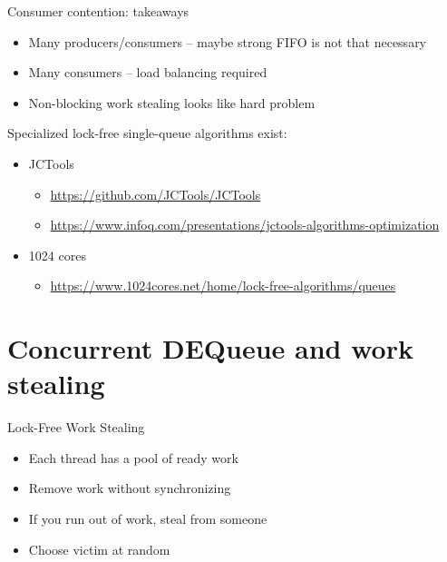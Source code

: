 \begin{frame}[t,fragile]{Consumer contention: takeaways}

\begin{itemize}
  \item Many producers/consumers -- maybe strong FIFO is not that necessary
  \pause \item Many consumers -- load balancing required
  \pause \item Non-blocking work stealing looks like hard problem
\end{itemize}

\pause

Specialized lock-free single-queue algorithms exist: 
\begin{itemize}
  \item JCTools 
  \begin{itemize}
    \item \url{https://github.com/JCTools/JCTools}
    \item \url{https://www.infoq.com/presentations/jctools-algorithms-optimization}
  \end{itemize}
  \item 1024 cores
  \begin{itemize}
    \item \url{https://www.1024cores.net/home/lock-free-algorithms/queues}  
  \end{itemize}
\end{itemize}

\end{frame}


\section{Concurrent DEQueue and work stealing}
\showTOC

\begin{frame}{Lock-Free Work Stealing}

\begin{itemize}
  \pause \item Each thread has a pool of ready work
  \pause \item Remove work without synchronizing
  \pause \item If you run out of work, steal from someone
  \pause \item Choose victim at random
\end{itemize}

\end{frame}

